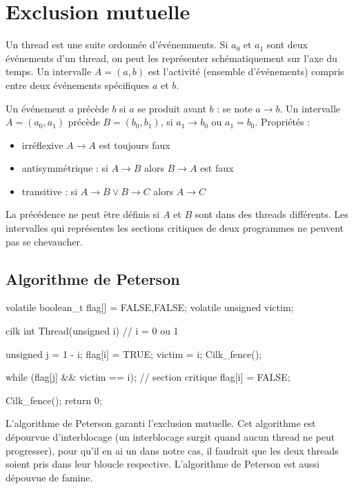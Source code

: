 \documentclass[11pt,a4paper]{report}
\begin{document}
\chapter{Exclusion mutuelle} %
\label{cha:Exclusion mutuelle}
Un thread est une suite ordonnée d'événemments. Si $a_0$ et $a_1$ sont deux événements d'un thread, on peut les représenter schématiquement sur l'axe du temps. Un intervalle $A=(a,b)$ est l'activité (ensemble d'événements) compris entre deux événements spécifiques $a$ et $b$.

Un événement $a$ précède $b$ si $a$ se produit avant $b$ : se note $a \rightarrow b$. Un intervalle $A=(a_0,a_1)$ précède $B=(b_0,b_1)$, si $a_1 \rightarrow b_0$ ou $a_1 = b_0$. Propriétés :
\begin{itemize}
    \item irréflexive $A \rightarrow A$ est toujours faux
    \item antisymmétrique : si $A \rightarrow B$ alors $B \rightarrow A$ est faux
    \item transitive : si $A \rightarrow B \vee B \rightarrow C$ alors $A \rightarrow C$
\end{itemize}

La précédence ne peut être définis si $A$ et $B$ sont dans des threads différents. Les intervalles qui représentes les sections critiques de deux programmes ne peuvent pas se chevaucher.

\section{Algorithme de Peterson} %
\label{sec:Algorithme de Peterson}

\begin{ccode}
    volatile boolean_t flag[] = {FALSE,FALSE};
    volatile unsigned victim;

    cilk int Thread(unsigned i) // i = 0 ou 1
    {
        unsigned j = 1 - i;
        flag[i] = TRUE;
        victim = i;
        Cilk_fence();

        while (flag[j] && victim == i);
        // section critique
        flag[i] = FALSE;

        Cilk_fence();
        return 0;
    }
\end{ccode}

L'algorithme de Peterson garanti l'exclusion mutuelle. Cet algorithme est dépourvue d'interblocage (un interblocage surgit quand aucun thread ne peut progresser), pour qu'il en ai un dans notre cas, il faudrait que les deux threads soient pris dans leur bloucle respective. L'algorithme de Peterson est aussi dépouvue de famine.
\end{document}

